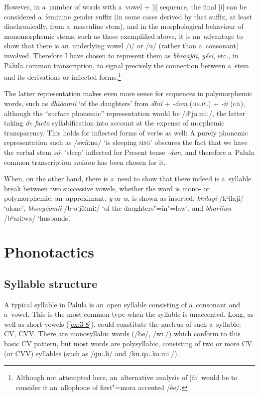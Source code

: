 However, in a~number of words with a~vowel + [i] sequence, the final [i] can be considered a~feminine gender suffix (in some cases derived by that suffix, at least diachronically, from a~masculine stem), and in the morphological behaviour of monomorphemic stems, such as those exemplified above, it is an~advantage to show that there is an~underlying vowel /i/ or /u/ (rather than a~consonant) involved. Therefore I have chosen to represent them as \textit{bhraaǰái}, \textit{yéei}, etc., in Palula common transcription, to signal precisely the connection between a~stem and its derivations or inflected forms.\footnote{Although not attempted here, an~alternative analysis of [ái] would be to consider it an~allophone of first"=mora accented /ée/.} 


The latter representation makes even more sense for sequences in polymorphemic words, such as \textit{dhióomii} `of the daughters' from \textit{dhií} + \textit{-óom} (\textsc{ob.pl)} + \textit{-ii} (\textsc{gn)}, although the ``surface phonemic'' representation would be /dʰjoːmiː/, the latter taking \textit{de facto} syllabification into account at the expense of morphemic transparency. This holds for inflected forms of verbs as well: A purely phonemic representation such as /swâːnu/ `is sleeping \textsc{msg}' obscures the fact that we have the verbal stem \textit{só-} `sleep' inflected for Present tense \textit{-áan}, and therefore a~Palula common transcription \textit{suáanu} has been chosen for it.


When, on the other hand, there is a~need to show that there indeed is a~syllable break between two successive vowels, whether the word is mono- or polymorphemic, an~approximant, \textit{y} or \textit{w}, is shown as inserted: \textit{khilayí} /kʰilají/ `alone', \textit{bhooyóomii} /bʰoːjôːmiː/ `of the daughters"=in"=law', and \textit{bharíiwa} /bʰariːwa/ `husbands'.


\section{Phonotactics}
\label{sec:3-3}

\subsection{Syllable structure}
\label{subsec:3-3-1}


A typical syllable in Palula is an~open syllable consisting of a~consonant and a~vowel. This is the most common type when the syllable is unaccented. Long, as well as short vowels (\ref{ex:3-8}), could constitute the nucleus of such a~syllable: CV, CVV. There are monosyllabic words (/be/, /wiː/) which conform to this basic CV pattern, but most words are polysyllabic, consisting of two or more CV (or CVV) syllables (such as /ɡuː.li/ and /ku.ɳaː.koːmiː/).


